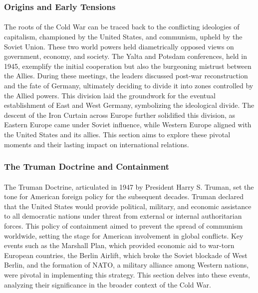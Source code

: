 \documentclass[a4paper,12pt]{book}
\begin{document}
\subsubsection*{Origins and Early Tensions}
\paragraph{}
The roots of the Cold War can be traced back to the conflicting ideologies of capitalism, championed by the United States, and communism, upheld by the Soviet Union. These two world powers held diametrically opposed views on government, economy, and society. The Yalta and Potsdam conferences, held in 1945, exemplify the initial cooperation but also the burgeoning mistrust between the Allies. During these meetings, the leaders discussed post-war reconstruction and the fate of Germany, ultimately deciding to divide it into zones controlled by the Allied powers. This division laid the groundwork for the eventual establishment of East and West Germany, symbolizing the ideological divide. The descent of the Iron Curtain across Europe further solidified this division, as Eastern Europe came under Soviet influence, while Western Europe aligned with the United States and its allies. This section aims to explore these pivotal moments and their lasting impact on international relations.

\subsubsection*{The Truman Doctrine and Containment}
\paragraph{}
The Truman Doctrine, articulated in 1947 by President Harry S. Truman, set the tone for American foreign policy for the subsequent decades. Truman declared that the United States would provide political, military, and economic assistance to all democratic nations under threat from external or internal authoritarian forces. This policy of containment aimed to prevent the spread of communism worldwide, setting the stage for American involvement in global conflicts. Key events such as the Marshall Plan, which provided economic aid to war-torn European countries, the Berlin Airlift, which broke the Soviet blockade of West Berlin, and the formation of NATO, a military alliance among Western nations, were pivotal in implementing this strategy. This section delves into these events, analyzing their significance in the broader context of the Cold War.
\end{document}
